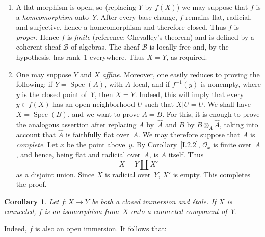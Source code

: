 \documentclass[11pt,oneside]{amsbook}
\newtheorem{corollary}[proposition]{Corollary}
\begin{document}
\begin{enumerate}
\item[1)] A flat morphism is open, so (replacing \(Y\) by \(f(X)\)) we may
  suppose that \(f\) is a \emph{homeomorphism} onto~\(Y\).  After every
  base change, \(f\) remains flat, radicial, and surjective, hence a
  homeomorphism and therefore closed.  Thus \(f\) is \emph{proper}.  Hence
  \(f\) is \emph{finite} (reference: Chevalley's theorem) and is defined by a coherent
  sheaf \(\mathcal B\) of algebras.  The sheaf \(\mathcal B\) is locally
  free and, by the hypothesis, has rank~\(1\) everywhere.  Thus \(X=Y\),
  as required.

\item[2)] One may suppose \(Y\) and \(X\) \emph{affine}.  Moreover, one easily
  reduces to proving the following: if
  \(Y=\operatorname{Spec}(A)\), with \(A\) local, and if \(f^{-1}(y)\) is
  nonempty, where \(y\) is the closed point of~\(Y\), then \(X=Y\).
  Indeed, this will imply that every \(y\in f(X)\) has an open
  neighborhood \(U\) such that \(X|U=U\).  We shall have
  \(X=\operatorname{Spec}(B)\), and we want to prove \(A=B\).  For this,
  it is enough to prove the analogous assertion after replacing \(A\)
  by~\(\widehat A\) and \(B\) by \(B\otimes_A\widehat A\), taking into
  account that \(\widehat A\) is faithfully flat over~\(A\).  We may
  therefore suppose that \(A\) is \emph{complete}.  Let \(x\) be the point
  above~\(y\).  By Corollary~\ref{I.2.2}, \(\mathcal O_x\) is finite
  over~\(A\), and hence, being flat and radicial over~\(A\), is \(A\)
  itself.  Thus
  \[
    X=Y\amalg X'
  \]
  as a disjoint union.  Since \(X\) is radicial over~\(Y\), \(X'\) is
  empty.  This completes the proof.
\end{enumerate}

\begin{corollary}
\label{I.5.2}
Let \(f\colon X\to Y\) be both a \emph{closed immersion} and \emph{étale}.  If \(X\) is
connected, \(f\) is an isomorphism from~\(X\) onto a connected component
of~\(Y\).
\end{corollary}

Indeed, \(f\) is also an open immersion.  It follows that:
\end{document}
